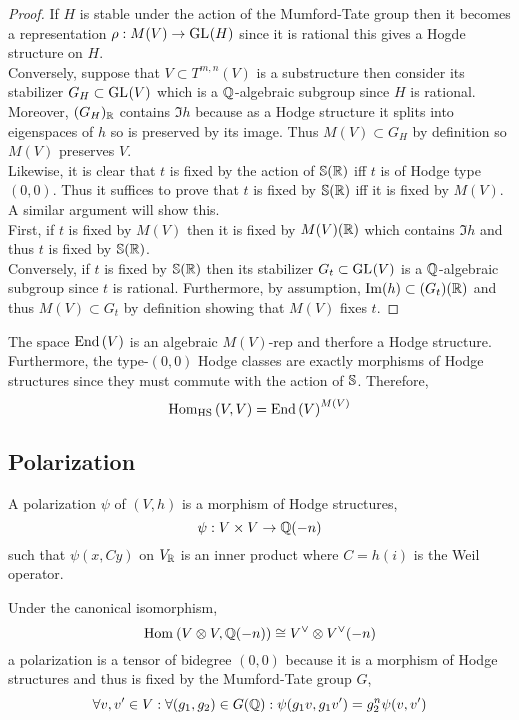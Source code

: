 \documentclass[12pt]{article}
\begin{document}
\begin{proof}
If $H$ is stable under the action of the Mumford-Tate group then it becomes a representation $\rho : M(V) \to \GL{}{H}$ since it is rational this gives a Hogde structure on $H$. 
\bigskip\\
Conversely, suppose that $V \subset T^{m,n}(V)$ is a substructure then consider its stabilizer $G_H \subset \GL{}{V}$ which is a $\Q$-algebraic subgroup since $H$ is rational. Moreover, $(G_H)_\R$ contains $\Im{h}$ because as a Hodge structure it splits into eigenspaces of $h$ so is preserved by its image. Thus $M(V) \subset G_H$ by definition so $M(V)$ preserves $V$.
\bigskip\\
Likewise, it is clear that $t$ is fixed by the action of $\S(\R)$ iff $t$ is of Hodge type $(0,0)$. Thus it suffices to prove that $t$ is fixed by $\S(\R)$ iff it is fixed by $M(V)$. A similar argument will show this.
\bigskip\\
First, if $t$ is fixed by $M(V)$ then it is fixed by $M(V)(\R)$ which contains $\Im{h}$ and thus $t$ is fixed by $\S(\R)$. 
\bigskip\\
Conversely, if $t$ is fixed by $\S(\R)$ then its stabilizer $G_t \subset \GL{}{V}$ is a $\Q$-algebraic subgroup since $t$ is rational. Furthermore, by assumption, $\Im{h} \subset (G_t)(\R)$ and thus $M(V) \subset G_t$ by definition showing that $M(V)$ fixes $t$.
\end{proof}

\begin{corollary}
The space $\End{V}$ is an algebraic $M(V)$-rep and therfore a Hodge structure. Furthermore, the type-$(0,0)$ Hodge classes are exactly morphisms of Hodge structures since they must commute with the action of $\S$. Therefore,
\[ \Hom{\text{HS}}{V}{V} = \End{V}^{M(V)} \] 
\end{corollary}


\subsection{Polarization}

\begin{definition}
A polarization $\psi$ of $(V, h)$ is a morphism of Hodge structures,
\[ \psi : V \times V \to \Q(-n) \]
such that $\psi(x, C y)$ on $V_\R$ is an inner product where $C = h(i)$ is the Weil operator.  
\end{definition}

\begin{remark}
Under the canonical isomorphism,
\[ \Hom{}{V \otimes V}{\Q(-n)} \cong V^\vee \otimes V^\vee(-n) \]
a polarization is a tensor of bidegree $(0,0)$ because it is a morphism of Hodge structures and thus is fixed by the Mumford-Tate group $G$,
\[ \forall v,v' \in V : \forall (g_1, g_2) \in G(\Q) : \psi(g_1 v, g_1 v') = g_2^n \psi(v, v') \]
\end{remark}
\end{document}
